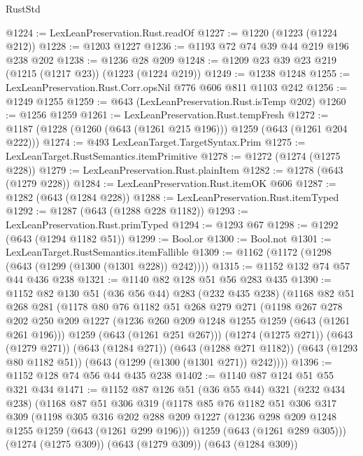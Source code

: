 \begin{lexlean}{RustStd}
\begin{coremodule}
@1224 := LexLeanPreservation.Rust.readOf
@1227 := @1220 (@1223 (@1224 @212))
@1228 := @1203 @1227
@1236 := @1193 @72 @74 @39 @44 @219 @196 @238 @202
@1238 := @1236 @28 @209
@1248 := @1209 @23 @39 @23 @219 (@1215 (@1217 @23)) (@1223 (@1224 @219))
@1249 := @1238 @1248
@1255 := LexLeanPreservation.Rust.Corr.opsNil @776 @606 @811 @1103 @242
@1256 := @1249 @1255
@1259 := @643 (LexLeanPreservation.Rust.isTemp @202)
@1260 := @1256 @1259
@1261 := LexLeanPreservation.Rust.tempFresh
@1272 := @1187 (@1228 (@1260 (@643 (@1261 @215 @196))) @1259 (@643 (@1261 @204 @222)))
@1274 := @493 LexLeanTarget.TargetSyntax.Prim
@1275 := LexLeanTarget.RustSemantics.itemPrimitive
@1278 := @1272 (@1274 (@1275 @228))
@1279 := LexLeanPreservation.Rust.plainItem
@1282 := @1278 (@643 (@1279 @228))
@1284 := LexLeanPreservation.Rust.itemOK @606
@1287 := @1282 (@643 (@1284 @228))
@1288 := LexLeanPreservation.Rust.itemTyped
@1292 := @1287 (@643 (@1288 @228 @1182))
@1293 := LexLeanPreservation.Rust.primTyped
@1294 := @1293 @67
@1298 := @1292 (@643 (@1294 @1182 @51))
@1299 := Bool.or
@1300 := Bool.not
@1301 := LexLeanTarget.RustSemantics.itemFallible
@1309 := @1162 (@1172 (@1298 (@643 (@1299 (@1300 (@1301 @228)) @242))))
@1315 := @1152 @132 @74 @57 @44 @436 @238
@1321 := @1140 @82 @128 @51 @56 @283 @435
@1390 := @1152
    @82
    @130
    @51
    (@36 @56 @44)
    @283
    (@232 @435 @238)
    (@1168
      @82
      @51
      @268
      @281
      (@1178
        @80
        @76
        @1182
        @51
        @268
        @279
        @271
        (@1198
          @267
          @278
          @202
          @250
          @209
          @1227
          (@1236 @260 @209 @1248 @1255 @1259 (@643 (@1261 @261 @196)))
          @1259
          (@643 (@1261 @251 @267)))
        (@1274 (@1275 @271))
        (@643 (@1279 @271))
        (@643 (@1284 @271))
        (@643 (@1288 @271 @1182))
        (@643 (@1293 @80 @1182 @51))
        (@643 (@1299 (@1300 (@1301 @271)) @242))))
@1396 := @1152 @128 @74 @56 @44 @435 @238
@1402 := @1140 @87 @124 @51 @55 @321 @434
@1471 := @1152
    @87
    @126
    @51
    (@36 @55 @44)
    @321
    (@232 @434 @238)
    (@1168
      @87
      @51
      @306
      @319
      (@1178
        @85
        @76
        @1182
        @51
        @306
        @317
        @309
        (@1198
          @305
          @316
          @202
          @288
          @209
          @1227
          (@1236 @298 @209 @1248 @1255 @1259 (@643 (@1261 @299 @196)))
          @1259
          (@643 (@1261 @289 @305)))
        (@1274 (@1275 @309))
        (@643 (@1279 @309))
        (@643 (@1284 @309))

\end{coremodule}
\end{lexlean}
